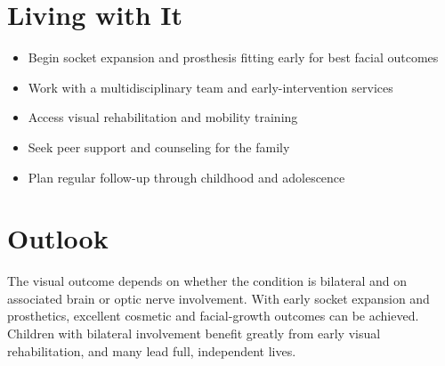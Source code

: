 \section{Living with It}
\begin{itemize}[noitemsep]
  \item Begin socket expansion and prosthesis fitting early for best facial outcomes
  \item Work with a multidisciplinary team and early-intervention services
  \item Access visual rehabilitation and mobility training
  \item Seek peer support and counseling for the family
  \item Plan regular follow-up through childhood and adolescence
\end{itemize}
\section{Outlook}
The visual outcome depends on whether the condition is bilateral and on associated brain or optic nerve involvement. With early socket expansion and prosthetics, excellent cosmetic and facial-growth outcomes can be achieved. Children with bilateral involvement benefit greatly from early visual rehabilitation, and many lead full, independent lives.
